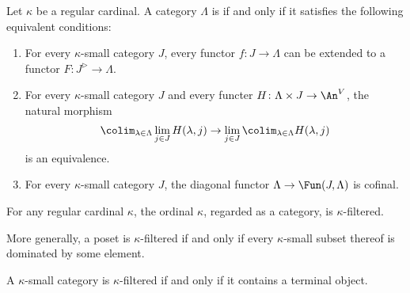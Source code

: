 \begin{definition}
	Let $ \kappa $ be a regular cardinal.
	A category $ \Lambda $ is  if and only if
	it satisfies the following equivalent conditions:
	\begin{enumerate}
		\item For every $ \kappa $-small category $ J $,
			every functor $ f \colon J \to \Lambda $ can be extended
			to a functor $ F \colon J^{\rhd} \to \Lambda $.
		\item For every $ \kappa $-small category $ J $
			and every functer $ H \colon \Lambda \times J \to \An^V$,
			the natural morphism
			\[
				\colim_{\lambda \in \Lambda} \lim_{j \in J} H(\lambda,j)
				\to
				\lim_{j \in J} \colim_{\lambda \in \Lambda} H(\lambda,j)
			\]
			is an equivalence.
		\item For every $ \kappa $-small category $ J $,
			the diagonal functor
			$ \Lambda \to \Fun(J, \Lambda) $
			is cofinal.
	\end{enumerate}
\end{definition}

\begin{eg}
	For any regular cardinal $ \kappa $,
	the ordinal $ \kappa $, regarded as a category,
	is $ \kappa $-filtered.

	More generally, a poset is $ \kappa $-filtered if and only if
	every $ \kappa $-small subset thereof is dominated by some element.
\end{eg}

\begin{eg}
	A $ \kappa $-small category is $ \kappa $-filtered
	if and only if it contains a terminal object.
\end{eg}

